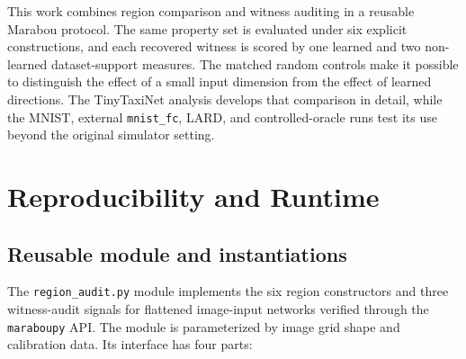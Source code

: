\documentclass[twocolumn,smallextended,runningheads]{svjour3}
\begin{document}
This work combines region comparison and witness auditing in a reusable Marabou protocol. The same property set is evaluated under six explicit constructions, and each recovered witness is scored by one learned and two non-learned dataset-support measures. The matched random controls make it possible to distinguish the effect of a small input dimension from the effect of learned directions. The TinyTaxiNet analysis develops that comparison in detail, while the MNIST, external \texttt{mnist\_fc}, LARD, and controlled-oracle runs test its use beyond the original simulator setting.

\section{Reproducibility and Runtime}
\label{sec:reproducibility}

\subsection{Reusable module and instantiations}
\label{sec:module}

The \texttt{region\_audit.py} module implements the six region constructors and three witness-audit signals for flattened image-input networks verified through the \texttt{maraboupy} API. The module is parameterized by image grid shape and calibration data. Its interface has four parts:
\end{document}
